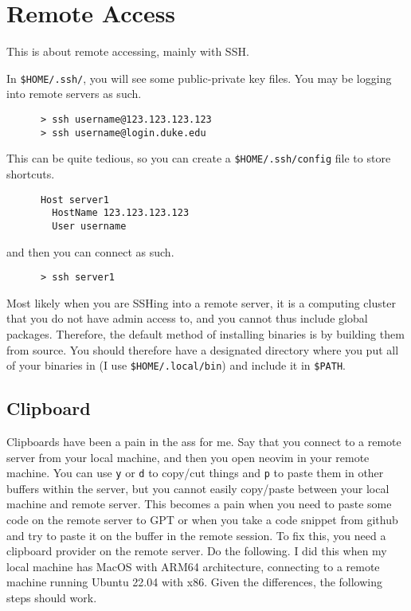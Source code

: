 \section{Remote Access} 

  This is about remote accessing, mainly with SSH. 

  \begin{definition}
    In \texttt{\$HOME/.ssh/}, you will see some public-private key files. You may be logging into remote servers as such. 

    \begin{lstlisting}
      > ssh username@123.123.123.123 
      > ssh username@login.duke.edu
    \end{lstlisting}

    This can be quite tedious, so you can create a \texttt{\$HOME/.ssh/config} file to store shortcuts. 
    \begin{lstlisting}
      Host server1
        HostName 123.123.123.123
        User username
    \end{lstlisting}
    and then you can connect as such. 
    \begin{lstlisting}
      > ssh server1
    \end{lstlisting}
  \end{definition}

  \begin{definition}
    Most likely when you are SSHing into a remote server, it is a computing cluster that you do not have admin access to, and you cannot thus include global packages. Therefore, the default method of installing binaries is by building them from source. You should therefore have a designated directory where you put all of your binaries in (I use \texttt{\$HOME/.local/bin}) and include it in \texttt{\$PATH}. 
  \end{definition}

\subsection{Clipboard}

  Clipboards have been a pain in the ass for me. Say that you connect to a remote server from your local machine, and then you open neovim in your remote machine. You can use \texttt{y} or \texttt{d} to copy/cut things and \texttt{p} to paste them in other buffers within the server, but you cannot easily copy/paste between your local machine and remote server. This becomes a pain when you need to paste some code on the remote server to GPT or when you take a code snippet from github and try to paste it on the buffer in the remote session. To fix this, you need a clipboard provider on the remote server. Do the following. I did this when my local machine has MacOS with ARM64 architecture, connecting to a remote machine running Ubuntu 22.04 with x86. Given the differences, the following steps should work. 

